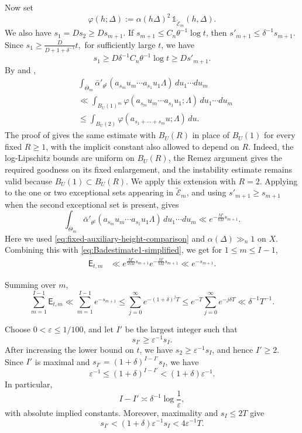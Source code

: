 \documentclass[reqno,11pt]{amsart}
\numberwithin{equation}{section}
\theoremstyle{definition}
\theoremstyle{remark}
\begin{document}
Now set
$$
\varphi(h;\Delta)
:=
\alpha(h\Delta)^{2}\,
\mathds{1}_{\widetilde{\mathcal E}_{m}}(h,\Delta).
$$
We also have $s_1=Ds_2\ge Ds_{m+1}$. If
$s_{m+1}\le C_n\theta^{-1}\log t$, then
$s'_{m+1}\le\delta^{-1}s_{m+1}$. Since
$
s_1\ge \frac{D}{D+1+\delta^{-1}}t,
$
for sufficiently large $t$, we have
$$
s_1\ge D\delta^{-1}C_n\theta^{-1}\log t
\ge Ds'_{m+1}.
$$
By  and ,
$$
\begin{aligned}
&\int_{\overline{\Theta}_m}
\bar{\alpha}'_{\theta^{\sharp}}(a_{s_m}u_m\cdots a_{s_1}u_1\Lambda)
\,du_1\cdots du_m\\ 
&\ll
\int_{B_{U}(1)^m}
\varphi(a_{s_m}u_m\cdots a_{s_1}u_1;\Lambda)\,du_1\cdots du_m \\
&\le
\int_{B_{U}(2)}
\varphi(a_{s_1+\cdots+s_m}u;\Lambda)\,du.
\end{aligned}
$$
The proof of  gives the same estimate with
$B_U(R)$ in place of $B_U(1)$ for every fixed $R\ge1$, with the implicit
constant also allowed to depend on $R$. Indeed, the log-Lipschitz bounds are
uniform on $B_U(R)$, the Remez argument gives the required goodness on its
fixed enlargement, and the instability estimate remains valid because
$B_U(1)\subset B_U(R)$. We apply this extension with $R=2$. Applying
 to the one or
two exceptional sets appearing in $\widetilde{\mathcal E}_m$, and using
$s'_{m+1}\ge s_{m+1}$ when the second exceptional set
is present, gives
$$
\int_{\overline{\Theta}_m}
\bar{\alpha}'_{\theta^{\sharp}}(a_{s_m}u_m\cdots a_{s_1}u_1\Lambda)
\,du_1\cdots du_m
\ll
e^{-\frac{M'}{bM}s_{m+1}}.
$$
Here we used \eqref{eq:fixed-auxiliary-height-comparison} and $\alpha(\Delta)\gg_n1$ on $X$.
Combining this with \eqref{eq:Badestimate1-simplified}, we get
for $1\le m\le I-1$,
\begin{equation}\label{eq:Badestimate3}
\begin{aligned}
\mathsf E_{t,m}
&\ll
e^{\frac{M'}{5bM}s_{m+1}}
e^{-\frac{M'}{bM}s_{m+1}} \ll e^{-s_{m+1}}.
\end{aligned}
\end{equation}

Summing over $m$,
$$
\sum_{m=1}^{I-1}\mathsf E_{t,m}
\ll
\sum_{m=1}^{I-1} e^{-s_{m+1}}
\le
\sum_{j=0}^{\infty}e^{-(1+\delta)^jT}
\le
e^{-T}\sum_{j=0}^{\infty}e^{-j\delta T}
\ll
\delta^{-1}T^{-1}.
$$


Choose $0<\varepsilon\le 1/100$, and let $I'$ be the largest
integer such that
$$
s_{I'}\ge \varepsilon^{-1}s_I.
$$
After increasing the lower bound on $t$, we have
$s_2\ge\varepsilon^{-1}s_I$, and hence $I'\ge2$.
Since $I'$ is maximal and
$s_{I'}=(1+\delta)^{I-I'}s_I$, we have
$$
\varepsilon^{-1}
\le (1+\delta)^{I-I'}
< (1+\delta)\varepsilon^{-1}.
$$
In particular,
$$
I-I'\asymp \delta^{-1}\log\frac1\varepsilon,
$$
with absolute implied constants.
Moreover, maximality and $s_I\le2T$ give
\begin{equation}\label{eq:I-prime-upper}
s_{I'}<(1+\delta)\varepsilon^{-1}s_I
<4\varepsilon^{-1}T.
\end{equation}
\end{document}
